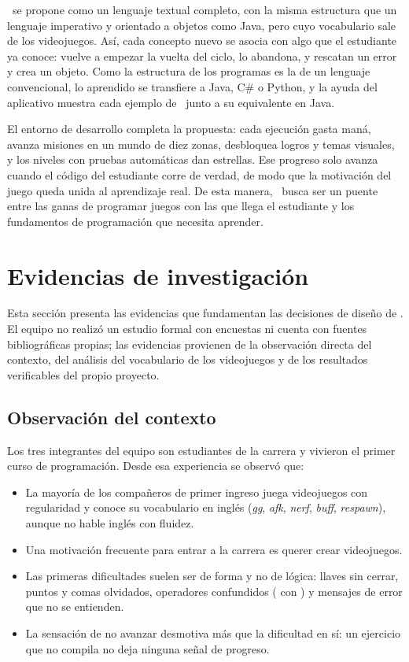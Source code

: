 \ggez\ se propone como un lenguaje textual completo, con la misma estructura que un lenguaje imperativo y orientado a objetos como Java, pero cuyo vocabulario sale de los videojuegos. Así, cada concepto nuevo se asocia con algo que el estudiante ya conoce:  vuelve a empezar la vuelta del ciclo,  lo abandona,  y  rescatan un error y  crea un objeto. Como la estructura de los programas es la de un lenguaje convencional, lo aprendido se transfiere a Java, C\# o Python, y la ayuda del aplicativo muestra cada ejemplo de \ggez\ junto a su equivalente en Java.

El entorno de desarrollo completa la propuesta: cada ejecución gasta maná, avanza misiones en un mundo de diez zonas, desbloquea logros y temas visuales, y los niveles con pruebas automáticas dan estrellas. Ese progreso solo avanza cuando el código del estudiante corre de verdad, de modo que la motivación del juego queda unida al aprendizaje real. De esta manera, \ggez\ busca ser un puente entre las ganas de programar juegos con las que llega el estudiante y los fundamentos de programación que necesita aprender.

\newpage
\section{Evidencias de investigación}

Esta sección presenta las evidencias que fundamentan las decisiones de diseño de \ggez. El equipo no realizó un estudio formal con encuestas ni cuenta con fuentes bibliográficas propias; las evidencias provienen de la observación directa del contexto, del análisis del vocabulario de los videojuegos y de los resultados verificables del propio proyecto.

\subsection{Observación del contexto}

Los tres integrantes del equipo son estudiantes de la carrera y vivieron el primer curso de programación. Desde esa experiencia se observó que:

\begin{itemize}
  \item La mayoría de los compañeros de primer ingreso juega videojuegos con regularidad y conoce su vocabulario en inglés (\emph{gg}, \emph{afk}, \emph{nerf}, \emph{buff}, \emph{respawn}), aunque no hable inglés con fluidez.
  \item Una motivación frecuente para entrar a la carrera es querer crear videojuegos.
  \item Las primeras dificultades suelen ser de forma y no de lógica: llaves sin cerrar, puntos y comas olvidados, operadores confundidos (\kw{=} con \kw{==}) y mensajes de error que no se entienden.
  \item La sensación de no avanzar desmotiva más que la dificultad en sí: un ejercicio que no compila no deja ninguna señal de progreso.
\end{itemize}

